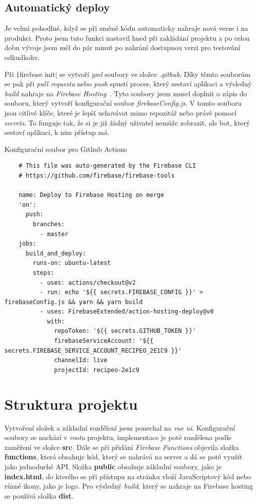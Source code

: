 \subsection{Automatický deploy}
Je velmi pohodlné, když se při změně kódu automaticky nahraje nová verze i na produkci. Proto jsem tuto funkci nastavil hned
při zakládání projektu a po celou dobu vývoje jsem měl do pár minut po nahrání dostupnou verzi pro testování odkudkoliv.

Při \texttt|firebase init| se vytvoří \emph{yml} soubory ve složce \emph{.github}. Díky těmto souborům se pak při
\emph{pull requestu} nebo \emph{push} spustí proces, který sestaví aplikaci a výsledný \emph{build} nahraje na \emph{Firebase Hosting}~\cite{FirebaseDeploy}.
Tyto soubory jsem musel doplnit o zápis do souboru, který vytvoří konfigurační soubor \emph{firebaseConfig.js}. V tomto souboru jsou citlivé klíče, které je lepší
uchovávat mimo repozitář nebo právě pomocí \emph{secrets}. To funguje tak, že si je již žádný uživatel nemůže zobrazit, ale bot, který sestaví aplikaci, k nim
přístup má.

\begin{listing}[h]
    \caption{Konfigurační soubor pro Github Actions}
    \begin{verbatim}
    # This file was auto-generated by the Firebase CLI
    # https://github.com/firebase/firebase-tools

    name: Deploy to Firebase Hosting on merge
    'on':
      push:
        branches:
          - master
    jobs:
      build_and_deploy:
        runs-on: ubuntu-latest
        steps:
          - uses: actions/checkout@v2
          - run: echo '${{ secrets.FIREBASE_CONFIG }}' > firebaseConfig.js && yarn && yarn build
          - uses: FirebaseExtended/action-hosting-deploy@v0
            with:
              repoToken: '${{ secrets.GITHUB_TOKEN }}'
              firebaseServiceAccount: '${{ secrets.FIREBASE_SERVICE_ACCOUNT_RECIPEO_2E1C9 }}'
              channelId: live
              projectId: recipeo-2e1c9
    \end{verbatim}
\end{listing}

\section{Struktura projektu}
Vytvoření složek a základní rozdělení jsem ponechal na \emph{vue ui}. Konfigurační soubory se nachází v \emph{rootu} projektu, implementace
je poté rozdělena podle zaměření ve složce \textbf{src}. Dále se při přidání \emph{Firebase Functions} objevila složka \textbf{functions}, která
obsahuje kód, který se nahrává na server a dá se poté využít jako jednoduché API. Složka \textbf{public} obsahuje základní soubory, jako je \textbf{index.html},
do kterého se při přístupu na stránku vloží JavaScriptový kód nebo různé ikony, jako je logo. Pro výsledný \emph{build}, který se nahraje na Firebase hosting se
používá složka \textbf{dist}.

